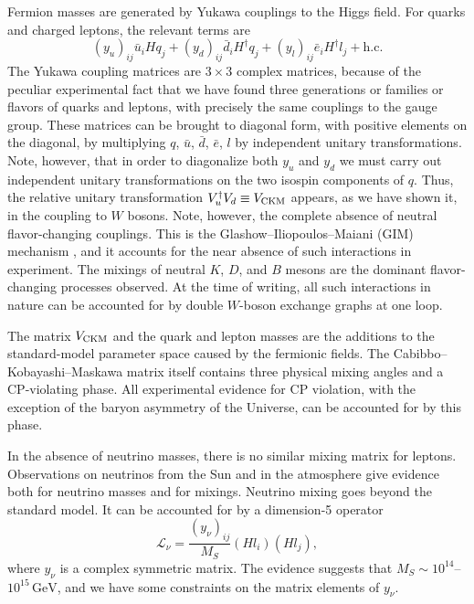 Fermion masses are generated by Yukawa couplings to the Higgs field. For
quarks and charged leptons, the relevant terms are
\begin{equation*}
  (y_u)_{ij}\bar u_iHq_j+(y_d)_{ij}\bar d_iH^\dagger q_j
  +(y_l)_{ij}\bar e_iH^\dagger l_j+\text{h.c.}
\end{equation*}
The Yukawa coupling matrices are $3\times3$ complex matrices, because of the
peculiar experimental fact that we have found three generations or families
or flavors of quarks and leptons, with precisely the same couplings to the
gauge group. These matrices can be brought to diagonal form, with positive
elements on the diagonal, by multiplying $q$, $\bar u$, $\bar d$, $\bar e$,
$l$ by independent unitary transformations. Note, however, that in order to
diagonalize both $y_u$ and $y_d$ we must carry out independent unitary
transformations on the two isospin components of $q$. Thus, the relative
unitary transformation $V_u^\dagger V_d\equiv V_{\rm CKM}$ appears, as we have
shown it, in the coupling to $W$ bosons. Note, however, the complete absence
of neutral flavor-changing couplings. This is the Glashow--Iliopoulos--Maiani
(GIM) mechanism \cite{banks-ref-93}, and it accounts for the near absence of
such interactions in experiment. The mixings of neutral $K$, $D$, and $B$
mesons are the dominant flavor-changing processes observed. At the time of
writing, all such interactions in nature can be accounted for by double
$W$-boson exchange graphs at one loop.

The matrix $V_{\rm CKM}$ and the quark and lepton masses are the additions to
the standard-model parameter space caused by the fermionic fields. The
Cabibbo--Kobayashi--Maskawa \cite{banks-ref-94,banks-ref-95} matrix itself
contains three physical mixing angles and a CP-violating phase. All
experimental evidence for CP violation, with the exception of the baryon
asymmetry of the Universe, can be accounted for by this phase.

In the absence of neutrino masses, there is no similar mixing matrix for
leptons. Observations on neutrinos from the Sun and in the atmosphere give
evidence both for neutrino masses and for mixings. Neutrino mixing goes beyond
the standard model. It can be accounted for by a dimension-5 operator
\begin{equation*}
  \mathcal L_\nu=\frac{(y_\nu)_{ij}}{M_S}(Hl_i)(Hl_j),
\end{equation*}
where $y_\nu$ is a complex symmetric matrix. The evidence suggests that
$M_S\sim10^{14}$--$10^{15}\,\mathrm{GeV}$, and we have some constraints on
the matrix elements of $y_\nu$.

